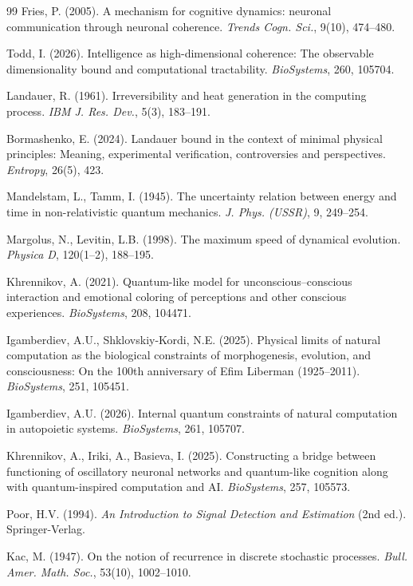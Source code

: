 \documentclass[12pt]{article}
\begin{document}
\begin{thebibliography}{99}
Fries, P. (2005). A mechanism for cognitive dynamics: neuronal communication through neuronal coherence. \textit{Trends Cogn. Sci.}, 9(10), 474--480.

Todd, I. (2026). Intelligence as high-dimensional coherence: The observable dimensionality bound and computational tractability. \textit{BioSystems}, 260, 105704.

Landauer, R. (1961). Irreversibility and heat generation in the computing process. \textit{IBM J. Res. Dev.}, 5(3), 183--191.

Bormashenko, E. (2024). Landauer bound in the context of minimal physical principles: Meaning, experimental verification, controversies and perspectives. \textit{Entropy}, 26(5), 423.

Mandelstam, L., Tamm, I. (1945). The uncertainty relation between energy and time in non-relativistic quantum mechanics. \textit{J. Phys. (USSR)}, 9, 249--254.

Margolus, N., Levitin, L.B. (1998). The maximum speed of dynamical evolution. \textit{Physica D}, 120(1--2), 188--195.

Khrennikov, A. (2021). Quantum-like model for unconscious--conscious interaction and emotional coloring of perceptions and other conscious experiences. \textit{BioSystems}, 208, 104471.

Igamberdiev, A.U., Shklovskiy-Kordi, N.E. (2025). Physical limits of natural computation as the biological constraints of morphogenesis, evolution, and consciousness: On the 100th anniversary of Efim Liberman (1925--2011). \textit{BioSystems}, 251, 105451.

Igamberdiev, A.U. (2026). Internal quantum constraints of natural computation in autopoietic systems. \textit{BioSystems}, 261, 105707.

Khrennikov, A., Iriki, A., Basieva, I. (2025). Constructing a bridge between functioning of oscillatory neuronal networks and quantum-like cognition along with quantum-inspired computation and AI. \textit{BioSystems}, 257, 105573.

Poor, H.V. (1994). \textit{An Introduction to Signal Detection and Estimation} (2nd ed.). Springer-Verlag.

Kac, M. (1947). On the notion of recurrence in discrete stochastic processes. \textit{Bull. Amer. Math. Soc.}, 53(10), 1002--1010.


\end{thebibliography}
\end{document}
